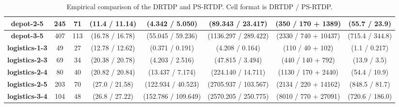 \documentclass[letterpaper]{article} %
\theoremstyle{remark}
\begin{document}
\begin{table*}[]
\begin{adjustbox}{width=1.53\columnwidth}
\begin{tabular}{|c|c|c||c|c|c|c|c|}
\textbf{depot-2-5}     & 245                 & 71                & (11.4 / 11.14)     & (4.342 / 5.050)                             & (89.343 / 23.417)                         & (350 / 170 + 1389)              & (55.7 / 23.9)             \\ \hline
\textbf{depot-3-5}     & 407                 & 113               & (16.78 / 16.78)    & (55.045 / 59.236)                           & (1136.297 / 289.422)                      & (2330 / 740 + 10437)             & (715.4 / 344.8)           \\ \hline\hline
\textbf{logistics-1-3} & 49                  & 27                & (12.78 / 12.62)    & (0.371 / 0.191)                             & (4.208 / 0.164)                           & (110 / 40 + 102)               & (1.1 / 0.217)             \\ \hline
\textbf{logistics-2-3} & 69                  & 34                & (20.38 / 20.78)    & (4.203 / 2.516)                             & (47.815 / 3.494)                          & (440 / 140 + 792)              & (13.9 / 3.5)              \\ \hline
\textbf{logistics-2-4} & 80                  & 40                & (20.82 / 20.84)    & (13.437 / 7.174)                            & (224.140 / 14.711)                        & (1130 / 170 + 2440)             & (54.4 / 10.9)             \\ \hline
\textbf{logistics-2-5} & 203                 & 70                & (27.0 / 21.58)     & (122.934 / 40.523)                          & (2705.937 / 103.567)                      & (2134 / 220 + 14162)             & (848.5 / 81.7)            \\ \hline
\textbf{logistics-3-4} & 104                 & 48                & (26.8 / 27.22)     & (152.786 / 109.649)                         & (2570.205 / 250.775)                      & (8010 / 770 + 27091)             & (720.6 / 186.0)           \\ \hline
\end{tabular}
\end{adjustbox}
\caption{Empirical comparison of the DRTDP and PS-RTDP. Cell format is DRTDP / PS-RTDP.}
\label{tbl:results}
\end{table*}
\end{document}
